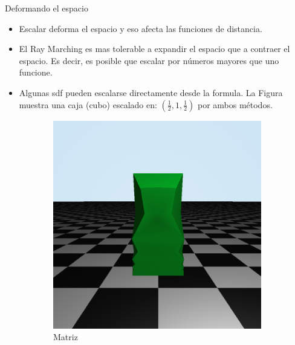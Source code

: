 \begin{frame}{Deformando el espacio}

\begin{itemize}
    \item Escalar \alert{deforma el espacio} y eso afecta las funciones de distancia.
    \item El Ray Marching es mas tolerable a expandir el espacio que a contraer el espacio. Es decir, es \alert{posible} que escalar por números mayores que uno funcione.
    \item Algunas sdf pueden escalarse directamente desde la formula. La Figura muestra una caja (cubo) escalado en: $(\frac{1}{2}, 1, \frac{1}{2})$ por ambos métodos.
\end{itemize}

\begin{figure}[htp]
 \centering
 \begin{subfigure}[b]{0.22\textwidth}
   \includegraphics[width=\textwidth]{img/inestable}
   \caption{Matriz}
 \end{subfigure}
~
 \begin{subfigure}[b]{0.22\textwidth}

\end{subfigure}
\end{figure}
\end{frame}
